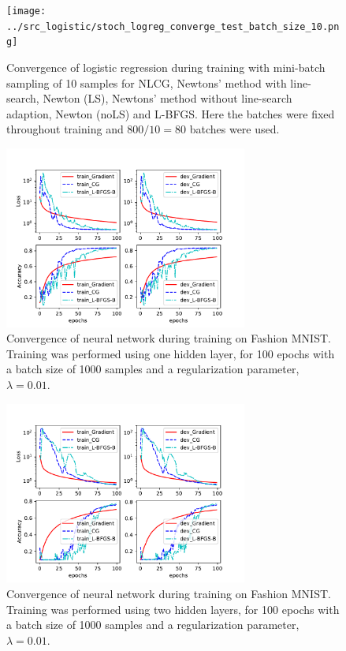 \documentclass[11pt,twocolumn]{article}
\begin{document}
\begin{figure}[!ht]
\centering
\texttt{[image: ../src\_logistic/stoch\_logreg\_converge\_test\_batch\_size\_10.png]}
\caption{Convergence of logistic regression during training with mini-batch sampling of 10 samples for NLCG, Newtons' method with line-search, Newton (LS),  Newtons' method without line-search adaption,  Newton (noLS) and L-BFGS. Here the batches were fixed throughout training and $800/10=80$ batches were used.}\label{StochFix_Logistic_regression_conv}
\end{figure}

\begin{figure}[!ht]
\centering
\includegraphics[height=6cm, width=8cm]{../src-mnist/compare_solvers_newtest_100_reg_0pt01_lr_0pt4.pdf}
\caption{Convergence of neural network during training on Fashion MNIST. Training was performed using one hidden layer, for 100 epochs with a batch size of 1000 samples and a regularization parameter, $\lambda=0.01$.}\label{NN_1layer}
\end{figure}

\begin{figure}[!ht]
\centering
\includegraphics[height=6cm, width=8cm]{../src-mnist/compare_solvers_nL_2_nepoch_100_reg_0pt01_lr_0pt4.pdf}
\caption{Convergence of neural network during training on Fashion MNIST. Training was performed using two hidden layers, for 100 epochs with a batch size of 1000 samples and a regularization parameter, $\lambda=0.01$.}\label{NN_2layer}
\end{figure}
\end{document}
